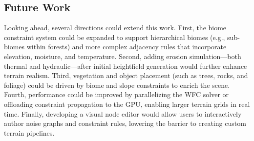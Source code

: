\documentclass[12pt]{article}
\begin{document}
\subsection{Future Work}
Looking ahead, several directions could extend this work. First, the biome constraint system could be expanded to support hierarchical biomes (e.g., sub-biomes within forests) and more complex adjacency rules that incorporate elevation, moisture, and temperature. Second, adding erosion simulation---both thermal and hydraulic---after initial heightfield generation would further enhance terrain realism. Third, vegetation and object placement (such as trees, rocks, and foliage) could be driven by biome and slope constraints to enrich the scene. Fourth, performance could be improved by parallelizing the WFC solver or offloading constraint propagation to the GPU, enabling larger terrain grids in real time. Finally, developing a visual node editor would allow users to interactively author noise graphs and constraint rules, lowering the barrier to creating custom terrain pipelines.


\printbibliography
\end{document}
